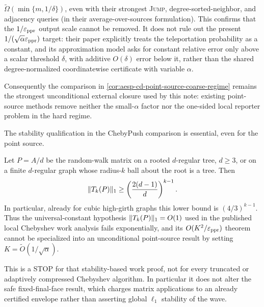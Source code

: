 \begin{proposition}
\begin{enumerate}
  \(\widetilde\Omega(\min\{m,1/\delta\})\), even with their strongest
  \textsc{Jump}, degree-sorted-neighbor, and adjacency queries (in their
  average-over-sources formulation).  This confirms that the
  \(1/\varepsilon_{\mathrm{ppr}}\) output scale cannot be removed.  It does not rule out the
  present \(1/(\sqrt\alpha\varepsilon_{\mathrm{ppr}})\) target: their paper explicitly treats
  the teleportation probability as a constant, and its approximation model
  asks for constant relative error only above a scalar threshold \(\delta\),
  with additive \(O(\delta)\) error below it, rather than the shared
  degree-normalized coordinatewise certificate with variable \(\alpha\).
\end{enumerate}
Consequently the comparison in
\cref{cor:aesp-cd-point-source-coarse-regime} remains the strongest
unconditional external closure used by this note: existing point-source
methods remove neither the small-\(\alpha\) factor nor the one-sided local
reporter problem in the hard regime.
\end{proposition}

The stability qualification in the ChebyPush comparison is essential, even
for the point source.

\begin{proposition}
\label{prop:aesp-cd-chebypush-stability-stop}
Let \(P=A/d\) be the random-walk matrix on a rooted \(d\)-regular tree,
\(d\geq3\), or on a finite \(d\)-regular graph whose radius-\(k\) ball about
the root is a tree.  Then
\begin{equation}
 \lVert T_k(P)\rVert_1\geq
 \left(\frac{2(d-1)}d\right)^{k-1}.
 \label{eq:aesp-cd-chebypush-stability-stop}
\end{equation}
In particular, already for cubic high-girth graphs this lower bound is
\((4/3)^{k-1}\).  Thus the universal-constant hypothesis
\(\lVert T_k(P)\rVert_1=O(1)\) used in the published local Chebyshev work analysis
fails exponentially, and its \(O(K^2/\varepsilon_{\mathrm{ppr}})\) theorem cannot be specialized
into an unconditional point-source result by setting
\(K=\widetilde O(1/\sqrt\alpha)\).

This is a STOP for that stability-based work proof, not for every truncated
or adaptively compressed Chebyshev algorithm.  In particular it does not
alter the safe fixed-final-face result, which charges matrix applications to
an already certified envelope rather than asserting global \(\ell_1\)
stability of the wave.
\end{proposition}

